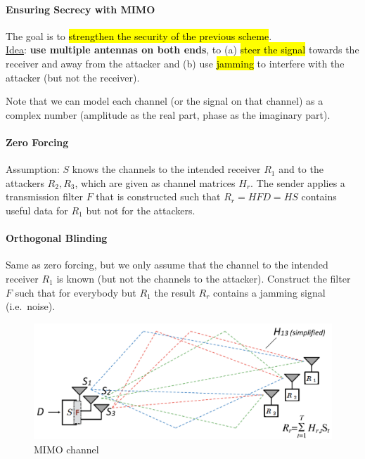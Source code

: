 \paragraph{Ensuring Secrecy with MIMO}
The goal is to \hl{strengthen the security of the previous scheme}.
\\
\underline{Idea}: \textbf{use multiple antennas on both ends}, to
(a) \hl{steer the signal} towards the receiver and away from the attacker and
(b) use \hl{jamming} to interfere with the attacker (but not the receiver).

Note that we can model each channel (or the signal on that channel) as a complex number (amplitude as the real part, phase as the imaginary part).

\paragraph{Zero Forcing}
Assumption: $S$ knows the channels to the intended receiver $R_1$ and to the attackers $R_2, R_3$, which are given as channel matrices $H_r$.
The sender applies a transmission filter $F$ that is constructed such that $R_r = H F D = H S$ contains useful data for $R_1$ but not for the attackers.

\paragraph{Orthogonal Blinding}
Same as zero forcing, but we only assume that the channel to the intended receiver $R_1$ is known (but not the channels to the attacker).
Construct the filter $F$ such that for everybody but $R_1$ the result $R_r$ contains a jamming signal (i.e.\ noise).

\begin{figure}[h]
	\centering
	\includegraphics[scale=0.3]{images/7-mimo.png}
	\caption{MIMO channel}%
	\label{fig:mimo}
\end{figure}


